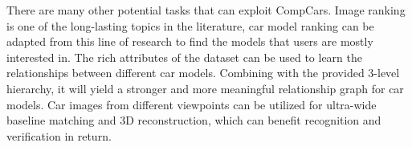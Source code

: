 \documentclass[10pt,twocolumn,letterpaper]{article}
\newcommand{\datasetName}{CompCars}
\begin{document}
There are many other potential tasks that can exploit \datasetName{}. Image ranking is one of the long-lasting topics in the literature, car model ranking can be adapted from this line of research to find the models that users are mostly interested in. The rich attributes of the dataset can be used to learn the relationships between different car models. Combining with the provided 3-level hierarchy, it will yield a stronger and more meaningful relationship graph for car models. Car images from different viewpoints can be utilized for ultra-wide baseline matching and 3D reconstruction, which can benefit recognition and verification in return.



{\small


}
\end{document}
